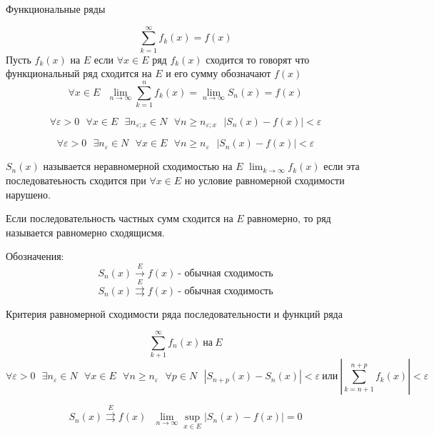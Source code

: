 \begin{title}
  Функциональные ряды
\end{title}

$$
\sum_{k=1}^{\infty} f_k (x) = f(x)
$$
Пусть $f_k(x)$ на $E$ если $\forall x \in E$ ряд $f_k(x)$ сходится то
говорят что функциональный ряд сходится на $E$ и его сумму обозначают $f(x)$
$$
\forall x \in E ~~~ \lim_{n \to \infty} \sum_{k=1}^n f_k(x) =
\lim_{n \to \infty} S_n(x) = f(x)
$$

\begin{define}
  $$
  \forall \varepsilon > 0 ~~~ \forall x \in E ~~~ \exists n_{\varepsilon; x}
  \in N ~~~ \forall n \ge n_{\varepsilon; x} ~~~ \left| S_n(x) - f(x) \right|
  < \varepsilon
  $$
\end{define}

\begin{define}
  $$
  \forall \varepsilon > 0 ~~~ \exists n_{\varepsilon} \in N ~~~ \forall x \in E
  ~~~ \forall n \ge n_{\varepsilon} ~~~ |S_n (x) - f(x)| < \varepsilon
  $$
\end{define}

$S_n(x)$ называется неравномерной сходимостью на $E$
$\lim_{k \to \infty} f_k(x)$ если эта последоватеьность сходится при
$\forall x \in E$ но условие равномерной сходимости нарушено.

\begin{define}
  Если последовательность частных сумм сходится на $E$ равномерно, то ряд
  называется равномерно сходящисмя.

  Обозначения:
  $$
  S_n(x) \stackrel{E}{\to} f(x) ~ \text{- обычная сходимость}
  $$
  $$
  S_n(x) \stackrel{E}{\rightrightarrows} f(x) ~ \text{- обычная сходимость}
  $$
\end{define}

\begin{title}
  Критерия равномерной сходимости ряда последовательности и функций ряда
\end{title}
\begin{theorem}
  $$
  \sum_{k+1}^{\infty} f_n(x) ~ \text{на} ~ E
  $$
  $$
  \forall \varepsilon > 0 ~~~ \exists n_{\varepsilon} \in N ~~~
  \forall x \in E ~~~ \forall n \ge n_{\varepsilon} ~~~ \forall p \in N ~~~
  |S_{n+p}(x) - S_n(x)| < \varepsilon ~ \text{или} ~
  \left| \sum_{k = n + 1}^{n+p} f_k(x) \right| < \varepsilon
  $$
\end{theorem}

\begin{theorem}
  $$
  S_n(x) \stackrel{E}{\rightrightarrows} f(x) ~~~
  \lim_{n \to \infty} \sup\limits_{x \in E} |S_n(x) - f(x)| = 0
  $$
\end{theorem}

